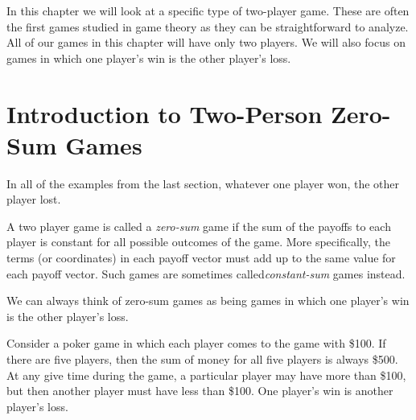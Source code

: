 In this chapter we will look at a specific type of two-player game. These are often the first games studied in game theory as they can be straightforward to analyze. All of our games in this chapter will have only two players. We will also focus on games in which one player's win is the other player's loss. 

\section{Introduction to Two-Person Zero-Sum Games}


\vspace{.2in}


In all of the examples from the last section, whatever one player won, the other player lost. 

\begin{definition}\label{D:zerosum} A two player game is called a \emph{zero-sum} game if the sum of the payoffs to each player is constant for all possible outcomes of the game. More specifically, the terms (or coordinates) in each payoff vector must add up to the same value for each payoff vector. Such games are sometimes called\emph{constant-sum} games instead.
\end{definition}

We can always think of zero-sum games as being games in which one player's win is the other player's loss.

\begin{example}\label{poker}
Consider a poker game in which each player comes to the game with \$100. If there are five players, then the sum of money for all five players is always \$500. At any give time during the game, a particular player may have more than \$100, but then another player must have less than \$100. One player's win is another player's loss.
\end{example}

